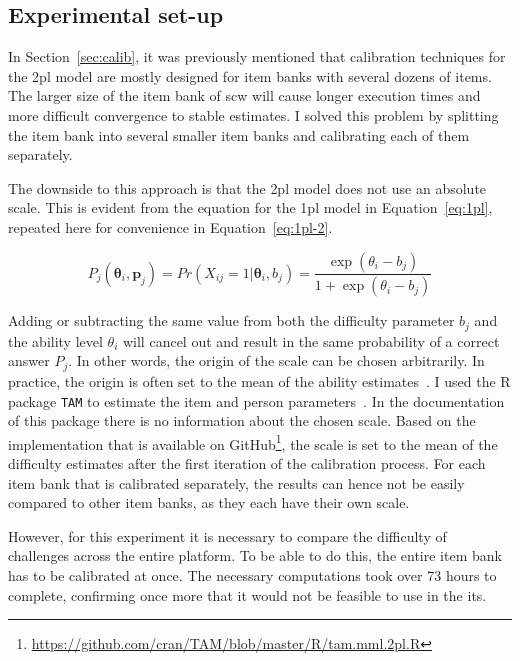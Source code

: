 \subsection{Experimental set-up}
In Section~\ref{sec:calib}, it was previously mentioned that calibration techniques for the \gls{2pl} model are mostly designed for item banks with several dozens of items.
The larger size of the item bank of \gls{scw} will cause longer execution times and more difficult convergence to stable estimates.
I solved this problem by splitting the item bank into several smaller item banks and calibrating each of them separately.

The downside to this approach is that the \gls{2pl} model does not use an absolute scale.
This is evident from the equation for the \gls{1pl} model in Equation~\ref{eq:1pl}, repeated here for convenience in Equation~\ref{eq:1pl-2}.

\begin{equation}
    \label{eq:1pl-2}
    P_{j}(\bm{\theta}_i,\bm{p}_j) =
    Pr(X_{ij} = 1 | \bm{\theta}_i,b_j) =
    \frac{\exp(\theta_i - b_j)}{1 + \exp(\theta_i - b_j)}
\end{equation}

Adding or subtracting the same value from both the difficulty parameter $b_j$ and the ability level $\theta_i$ will cancel out and result in the same probability of a correct answer $P_j$.
In other words, the origin of the scale can be chosen arbitrarily.
In practice, the origin is often set to the mean of the ability estimates~\cite{magis2017computerized}.
I used the R package \texttt{TAM} to estimate the item and person parameters~\cite{robitzsch2021package}.
In the documentation of this package there is no information about the chosen scale.
Based on the implementation that is available on GitHub\footnote{\url{https://github.com/cran/TAM/blob/master/R/tam.mml.2pl.R}}, the scale is set to the mean of the difficulty estimates after the first iteration of the calibration process.
For each item bank that is calibrated separately, the results can hence not be easily compared to other item banks, as they each have their own scale.

However, for this experiment it is necessary to compare the difficulty of challenges across the entire platform.
To be able to do this, the entire item bank has to be calibrated at once. 
The necessary computations took over 73 hours to complete, confirming once more that it would not be feasible to use in the \gls{its}.


